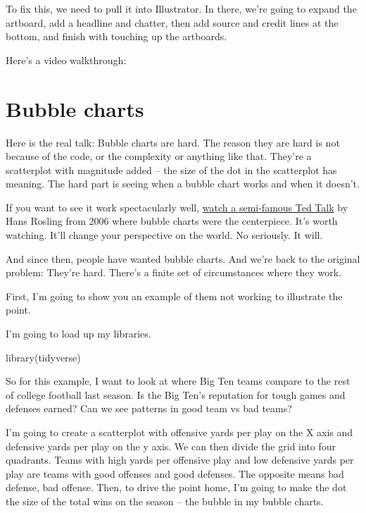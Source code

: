 \documentclass[
]{book}
\newenvironment{Shaded}{\begin{snugshade}}{\end{snugshade}}
\newcommand{\FunctionTok}[1]{\textcolor[rgb]{0.00,0.00,0.00}{#1}}
\newcommand{\NormalTok}[1]{#1}
\begin{document}
To fix this, we need to pull it into Illustrator. In there, we're going to expand the artboard, add a headline and chatter, then add source and credit lines at the bottom, and finish with touching up the artboards.

Here's a video walkthrough:

\hypertarget{bubble-charts}{%
\chapter{Bubble charts}\label{bubble-charts}}

Here is the real talk: Bubble charts are hard. The reason they are hard is not because of the code, or the complexity or anything like that. They're a scatterplot with magnitude added -- the size of the dot in the scatterplot has meaning. The hard part is seeing when a bubble chart works and when it doesn't.

If you want to see it work spectacularly well, \href{https://www.youtube.com/watch?v=hVimVzgtD6w}{watch a semi-famous Ted Talk} by Hans Rosling from 2006 where bubble charts were the centerpiece. It's worth watching. It'll change your perspective on the world. No seriously. It will.

And since then, people have wanted bubble charts. And we're back to the original problem: They're hard. There's a finite set of circumstances where they work.

First, I'm going to show you an example of them not working to illustrate the point.

I'm going to load up my libraries.

\begin{Shaded}
\begin{Highlighting}[]
\FunctionTok{library}\NormalTok{(tidyverse)}
\end{Highlighting}
\end{Shaded}

So for this example, I want to look at where Big Ten teams compare to the rest of college football last season. Is the Big Ten's reputation for tough games and defenses earned? Can we see patterns in good team vs bad teams?

I'm going to create a scatterplot with offensive yards per play on the X axis and defensive yards per play on the y axis. We can then divide the grid into four quadrants. Teams with high yards per offensive play and low defensive yards per play are teams with good offenses and good defenses. The opposite means bad defense, bad offense. Then, to drive the point home, I'm going to make the dot the size of the total wins on the season -- the bubble in my bubble charts.
\end{document}
